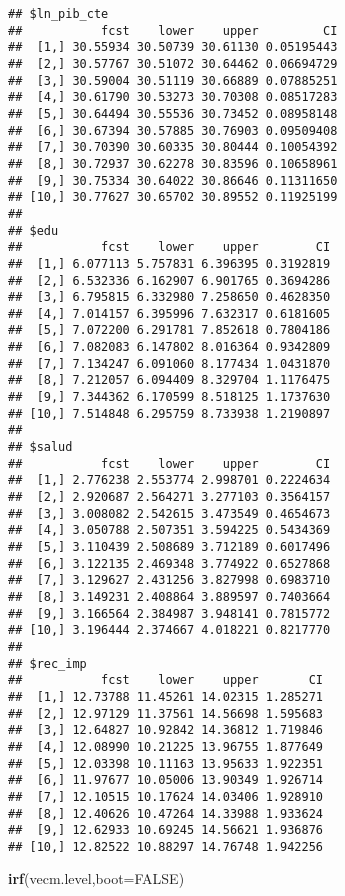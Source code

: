 \documentclass[]{book}
\newenvironment{Shaded}{\begin{snugshade}}{\end{snugshade}}
\newcommand{\KeywordTok}[1]{\textcolor[rgb]{0.13,0.29,0.53}{\textbf{#1}}}
\newcommand{\DataTypeTok}[1]{\textcolor[rgb]{0.13,0.29,0.53}{#1}}
\newcommand{\OtherTok}[1]{\textcolor[rgb]{0.56,0.35,0.01}{#1}}
\newcommand{\NormalTok}[1]{#1}
\theoremstyle{definition}
\theoremstyle{definition}
\theoremstyle{definition}
\theoremstyle{remark}
\begin{document}
\begin{verbatim}
## $ln_pib_cte
##           fcst    lower    upper         CI
##  [1,] 30.55934 30.50739 30.61130 0.05195443
##  [2,] 30.57767 30.51072 30.64462 0.06694729
##  [3,] 30.59004 30.51119 30.66889 0.07885251
##  [4,] 30.61790 30.53273 30.70308 0.08517283
##  [5,] 30.64494 30.55536 30.73452 0.08958148
##  [6,] 30.67394 30.57885 30.76903 0.09509408
##  [7,] 30.70390 30.60335 30.80444 0.10054392
##  [8,] 30.72937 30.62278 30.83596 0.10658961
##  [9,] 30.75334 30.64022 30.86646 0.11311650
## [10,] 30.77627 30.65702 30.89552 0.11925199
## 
## $edu
##           fcst    lower    upper        CI
##  [1,] 6.077113 5.757831 6.396395 0.3192819
##  [2,] 6.532336 6.162907 6.901765 0.3694286
##  [3,] 6.795815 6.332980 7.258650 0.4628350
##  [4,] 7.014157 6.395996 7.632317 0.6181605
##  [5,] 7.072200 6.291781 7.852618 0.7804186
##  [6,] 7.082083 6.147802 8.016364 0.9342809
##  [7,] 7.134247 6.091060 8.177434 1.0431870
##  [8,] 7.212057 6.094409 8.329704 1.1176475
##  [9,] 7.344362 6.170599 8.518125 1.1737630
## [10,] 7.514848 6.295759 8.733938 1.2190897
## 
## $salud
##           fcst    lower    upper        CI
##  [1,] 2.776238 2.553774 2.998701 0.2224634
##  [2,] 2.920687 2.564271 3.277103 0.3564157
##  [3,] 3.008082 2.542615 3.473549 0.4654673
##  [4,] 3.050788 2.507351 3.594225 0.5434369
##  [5,] 3.110439 2.508689 3.712189 0.6017496
##  [6,] 3.122135 2.469348 3.774922 0.6527868
##  [7,] 3.129627 2.431256 3.827998 0.6983710
##  [8,] 3.149231 2.408864 3.889597 0.7403664
##  [9,] 3.166564 2.384987 3.948141 0.7815772
## [10,] 3.196444 2.374667 4.018221 0.8217770
## 
## $rec_imp
##           fcst    lower    upper       CI
##  [1,] 12.73788 11.45261 14.02315 1.285271
##  [2,] 12.97129 11.37561 14.56698 1.595683
##  [3,] 12.64827 10.92842 14.36812 1.719846
##  [4,] 12.08990 10.21225 13.96755 1.877649
##  [5,] 12.03398 10.11163 13.95633 1.922351
##  [6,] 11.97677 10.05006 13.90349 1.926714
##  [7,] 12.10515 10.17624 14.03406 1.928910
##  [8,] 12.40626 10.47264 14.33988 1.933624
##  [9,] 12.62933 10.69245 14.56621 1.936876
## [10,] 12.82522 10.88297 14.76748 1.942256
\end{verbatim}

\begin{Shaded}
\begin{Highlighting}[]
\KeywordTok{irf}\NormalTok{(vecm.level,}\DataTypeTok{boot=}\OtherTok{FALSE}\NormalTok{)}
\end{Highlighting}
\end{Shaded}
\end{document}
